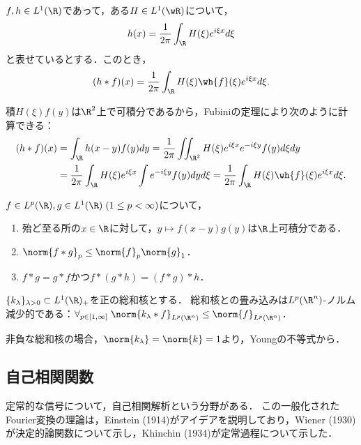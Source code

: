 \documentclass[uplatex,dvipdfmx]{jsreport}
\begin{document}
\begin{proposition}
    $f,h\in L^1(\R)$であって，ある$H\in L^1(\wR)$について，
    \[h(x)=\frac{1}{2\pi}\int_\R H(\xi)e^{i\xi x}d\xi\]
    と表せているとする．このとき，
    \[(h*f)(x)=\frac{1}{2\pi}\int_\R H(\xi)\wh{f}(\xi)e^{i\xi x}d\xi.\]
\end{proposition}
\begin{Proof}
    積$H(\xi)f(y)$は$\R^2$上で可積分であるから，Fubiniの定理により次のように計算できる：
    \begin{align*}
        (h*f)(x)&=\int_\R h(x-y)f(y)dy=\frac{1}{2\pi}\iint_{\R^2}H(\xi)e^{i\xi x}e^{-i\xi y}f(y)d\xi dy\\
        &=\frac{1}{2\pi}\int_\R H(\xi)e^{i\xi x}\int e^{-i\xi y}f(y)dyd\xi=\frac{1}{2\pi}\int_\R H(\xi)\wh{f}(\xi)e^{i\xi x}d\xi.
    \end{align*}
\end{Proof}

\begin{theorem}[Youngの不等式]
    $f\in L^p(\R),g\in L^1(\R)\;(1\le p<\infty)$について，
    \begin{enumerate}
        \item 殆ど至る所の$x\in\R$に対して，$y\mapsto f(x-y)g(y)$は$\R$上可積分である．
        \item $\norm{f*g}_p\le\norm{f}_p\norm{g}_1$．
        \item $f*g=g*f$かつ$f*(g*h)=(f*g)*h$．
    \end{enumerate}
\end{theorem}

\begin{corollary}
    $\{k_\lambda\}_{\lambda>0}\subset L^1(\R)_+$を正の総和核とする．
    総和核との畳み込みは$L^p(\R^n)$-ノルム減少的である：$\forall_{p\in[1,\infty]}\;\norm{k_\lambda*f}_{L^p(\R^n)}\le\norm{f}_{L^p(\R^n)}$．
\end{corollary}
\begin{Proof}
    非負な総和核の場合，$\norm{k_\lambda}=\norm{k}=1$より，Youngの不等式から．
\end{Proof}

\subsection{自己相関関数}

\begin{tcolorbox}[colframe=ForestGreen, colback=ForestGreen!10!white,breakable,colbacktitle=ForestGreen!40!white,coltitle=black,fonttitle=\bfseries\sffamily,
title=]
    定常的な信号について，自己相関解析という分野がある．
    この一般化されたFourier変換の理論は，Einstein (1914)がアイデアを説明しており，Wiener (1930)が決定的論関数について示し，Khinchin (1934)が定常過程について示した．
\end{tcolorbox}
\end{document}
